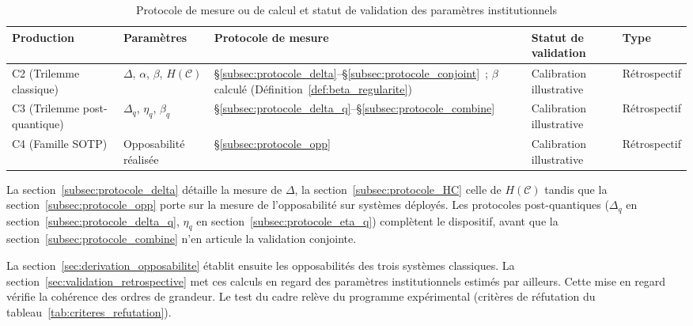 \begin{sloppypar}
\begin{table}[htbp]
\centering
\caption{Protocole de mesure ou de calcul et statut de validation des param\`etres institutionnels}
\label{tab:parametres_mesure}
\small
\setlength{\tabcolsep}{4pt} %
\begin{adjustbox}{max width=\linewidth} %
\begin{tabularx}{\linewidth}{@{}p{2.6cm} p{2.6cm} >{\raggedright\arraybackslash}X p{2.6cm} l@{}}
\toprule
\textbf{Production} & \textbf{Param\`etres} & \textbf{Protocole de mesure} &
\textbf{Statut de validation} & \textbf{Type} \\
\midrule
C2 (Trilemme classique)
  & $\Delta$, $\alpha$, $\beta$, $H(\mathcal{C})$
  & \S\ref{subsec:protocole_delta}--\S\ref{subsec:protocole_conjoint}~; $\beta$ calcul\'e (D\'efinition~\ref{def:beta_regularite})
  & Calibration illustrative & R\'etrospectif \\
C3 (Trilemme post-quantique)
  & $\Delta_q$, $\eta_q$, $\beta_q$
  & \S\ref{subsec:protocole_delta_q}--\S\ref{subsec:protocole_combine}
  & Calibration illustrative & R\'etrospectif \\
C4 (Famille SOTP)
  & Opposabilit\'e r\'ealis\'ee
  & \S\ref{subsec:protocole_opp}
  & Calibration illustrative & R\'etrospectif \\
\bottomrule
\end{tabularx}
\end{adjustbox}
\end{table}

La section~\ref{subsec:protocole_delta} d\'etaille la mesure de $\Delta$,
la section~\ref{subsec:protocole_HC} celle de $H(\mathcal{C})$ tandis que la
section~\ref{subsec:protocole_opp} porte sur la mesure de l'opposabilit\'e sur
syst\`emes d\'eploy\'es. Les protocoles post-quantiques
($\Delta_q$ en section~\ref{subsec:protocole_delta_q}, $\eta_q$ en
section~\ref{subsec:protocole_eta_q}) compl\`etent le dispositif, avant que
la section~\ref{subsec:protocole_combine} n'en articule la validation
conjointe.

La section~\ref{sec:derivation_opposabilite} \'etablit ensuite les
opposabilit\'es des trois syst\`emes classiques. La
section~\ref{sec:validation_retrospective} met ces calculs en regard
des param\`etres institutionnels estim\'es par ailleurs. Cette mise en regard
v\'erifie la coh\'erence des ordres de grandeur. Le test du cadre rel\`eve du
programme exp\'erimental (crit\`eres de r\'efutation du
tableau~\ref{tab:criteres_refutation}).


\end{sloppypar}
